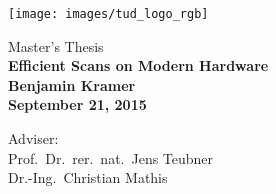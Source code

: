 \thispagestyle{empty}
\vspace*{-2.5cm}
\newlength{\links}
\setlength{\links}{0cm}
\sf

\hspace*{\links}
\begin{minipage}{12.5cm}
\texttt{[image: images/tud\_logo\_rgb]}
\end{minipage}

\vspace*{3.6cm}

\hspace*{\links}
\hspace*{0.0cm}
\begin{minipage}{9cm}
\large
\begin{center}
{\LARGE Master's Thesis}\\
\vspace*{1cm}
\bf{\LARGE Efficient Scans on Modern Hardware}\\
\vspace*{1.5cm}
\large Benjamin Kramer\\
September 21, 2015
\end{center}
\end{minipage}

\vspace*{3cm}

\hspace*{\links}


\vspace*{.6cm}

\hspace*{\links}
\begin{minipage}[b]{6cm}
\normalsize
\normalfont
\raggedright
Adviser: \\
Prof.\ Dr.\ rer.\ nat.\ Jens Teubner\\
Dr.-Ing.\ Christian Mathis\\
\end{minipage}

